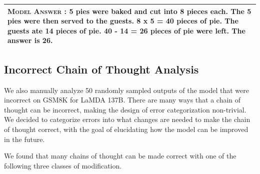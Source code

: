 \documentclass[]{article}
\theoremstyle{plain}
\theoremstyle{definition}
\theoremstyle{remark}
\newcommand{\lamda}[0]{LaMDA}
\begin{document}
\begin{table}[ht]
\begin{tabular}{p{\linewidth}}
        \vspace{-1mm}
        \textbf{\textsc{Model Answer \color{darkGreen}{(correct but inverted semantics)}:}} 5 pies were baked and cut into 8 pieces each.  The 5 pies were then served to the guests.  8 x 5 = 40 pieces of pie.  {\color{blue} The guests ate 14 pieces of pie.  40 - 14 = 26 pieces of pie were left.}  The answer is 26. \color{darkGreen}{\checkmark} \\
        \bottomrule
    \end{tabular}
    \label{tab:appendix-gsm8k-correct-analysis}
\end{table}
\endgroup

\clearpage
\subsection{Incorrect Chain of Thought Analysis}\label{subsec:incorrect-chain-of-thought-analysis}
We also manually analyze 50 randomly sampled outputs of the model that were incorrect on GSM8K for \lamda{} 137B. 
There are many ways that a chain of thought can be incorrect, making the design of error categorization non-trivial.
We decided to categorize errors into what changes are needed to make the chain of thought correct, with the goal of elucidating how the model can be improved in the future.

We found that many chains of thought can be made correct with one of the following three classes of modification.
\end{document}
